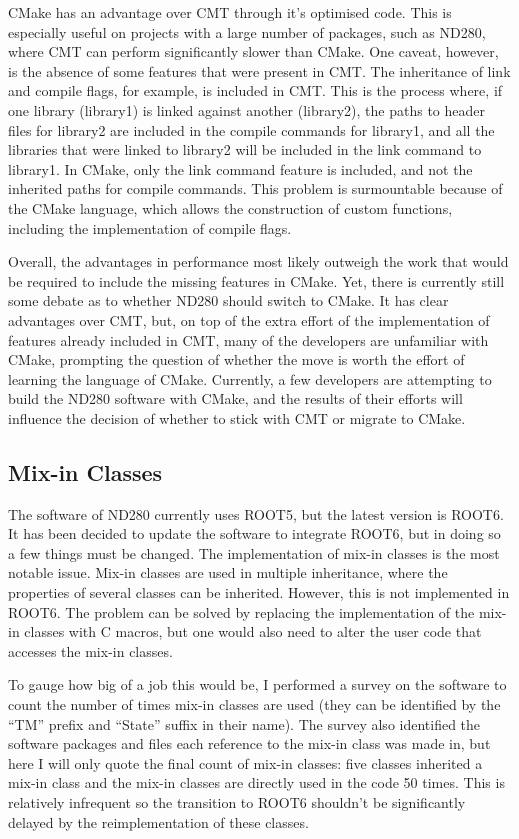 \documentclass[aps,pra,12pt,notitlepage,tightenlines]{revtex4-1}
\begin{document}
CMake has an advantage over CMT through it's optimised code. This is especially useful on projects with a large number of packages, such as ND280, where CMT can perform significantly slower than CMake. One caveat, however, is the absence of some features that were present in CMT. The inheritance of link and compile flags, for example, is included in CMT. This is the process where, if one library (library1) is linked against another (library2), the paths to header files for library2 are included in the compile commands for library1, and all the libraries that were linked to library2 will be included in the link command to library1. In CMake, only the link command feature is included, and not the inherited paths for compile commands. This problem is surmountable because of the CMake language, which allows the construction of custom functions, including the implementation of compile flags. 

Overall, the advantages in performance most likely outweigh the work that would be required to include the missing features in CMake. Yet, there is currently still some debate as to whether ND280 should switch to CMake. It has clear advantages over CMT, but, on top of the extra effort of the implementation of features already included in CMT, many of the developers are unfamiliar with CMake, prompting the question of whether the move is worth the effort of learning the language of CMake. Currently, a few developers are attempting to build the ND280 software with CMake, and the results of their efforts will influence the decision of whether to stick with CMT or migrate to CMake.

\subsection{Mix-in Classes}
The software of ND280 currently uses ROOT5, but the latest version is ROOT6. It has been decided to update the software to integrate ROOT6, but in doing so a few things must be changed. The implementation of mix-in classes is the most notable issue. Mix-in classes are used in multiple inheritance, where the properties of several classes can be inherited. However, this is not implemented in ROOT6. The problem can be solved by replacing the implementation of the mix-in classes with C macros, but one would also need to alter the user code that accesses the mix-in classes.

To gauge how big of a job this would be, I performed a survey on the software to count the number of times mix-in classes are used (they can be identified by the ``TM'' prefix and ``State'' suffix in their name). The survey also identified the software packages and files each reference to the mix-in class was made in, but here I will only quote the final count of mix-in classes: five classes inherited a mix-in class and the mix-in classes are directly used in the code 50 times. This is relatively infrequent so the transition to ROOT6 shouldn't be significantly delayed by the reimplementation of these classes.
\end{document}
